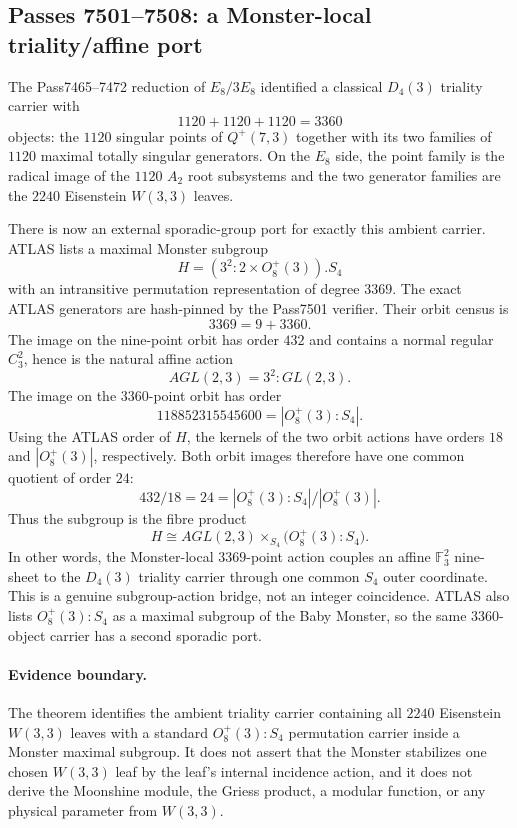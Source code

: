 \subsection*{Passes 7501--7508: a Monster-local triality/affine port}

The Pass7465--7472 reduction of $E_8/3E_8$ identified a classical $D_4(3)$
triality carrier with
\[
 \boxed{1120+1120+1120=3360}
\]
objects: the $1120$ singular points of $Q^+(7,3)$ together with its two families
of $1120$ maximal totally singular generators.  On the $E_8$ side, the point
family is the radical image of the $1120$ $A_2$ root subsystems and the two
generator families are the $2240$ Eisenstein $W(3,3)$ leaves.

There is now an external sporadic-group port for exactly this ambient carrier.
ATLAS lists a maximal Monster subgroup
\[
 H=(3^2{:}2\times O_8^+(3)).S_4
\]
with an intransitive permutation representation of degree $3369$.  The exact
ATLAS generators are hash-pinned by the Pass7501 verifier.  Their orbit census is
\[
 \boxed{3369=9+3360}.
\]
The image on the nine-point orbit has order $432$ and contains a normal regular
$C_3^2$, hence is the natural affine action
\[
 \boxed{AGL(2,3)=3^2{:}GL(2,3)}.
\]
The image on the $3360$-point orbit has order
\[
 \boxed{118852315545600=|O_8^+(3):S_4|}.
\]
Using the ATLAS order of $H$, the kernels of the two orbit actions have orders
$18$ and $|O_8^+(3)|$, respectively.  Both orbit images therefore have one
common quotient of order $24$:
\[
 432/18=24
 =|O_8^+(3):S_4|/|O_8^+(3)|.
\]
Thus the subgroup is the fibre product
\[
 \boxed{
 H\cong AGL(2,3)\times_{S_4}\bigl(O_8^+(3):S_4\bigr).
 }
\]
In other words, the Monster-local $3369$-point action couples an affine
$\mathbb F_3^2$ nine-sheet to the $D_4(3)$ triality carrier through one common
$S_4$ outer coordinate.  This is a genuine subgroup-action bridge, not an
integer coincidence.  ATLAS also lists $O_8^+(3):S_4$ as a maximal subgroup of
the Baby Monster, so the same $3360$-object carrier has a second sporadic port.

\paragraph{Evidence boundary.}
The theorem identifies the ambient triality carrier containing all $2240$
Eisenstein $W(3,3)$ leaves with a standard $O_8^+(3):S_4$ permutation carrier
inside a Monster maximal subgroup.  It does not assert that the Monster
stabilizes one chosen $W(3,3)$ leaf by the leaf's internal incidence action, and
it does not derive the Moonshine module, the Griess product, a modular function,
or any physical parameter from $W(3,3)$.
